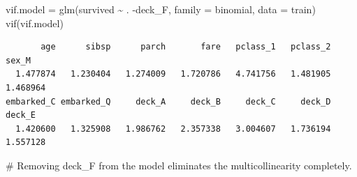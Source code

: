 \documentclass[
  letterpaper,
  DIV=11,
  numbers=noendperiod]{scrartcl}
\newenvironment{Shaded}{\begin{snugshade}}{\end{snugshade}}
\newcommand{\AttributeTok}[1]{\textcolor[rgb]{0.40,0.45,0.13}{#1}}
\newcommand{\CommentTok}[1]{\textcolor[rgb]{0.37,0.37,0.37}{#1}}
\newcommand{\FunctionTok}[1]{\textcolor[rgb]{0.28,0.35,0.67}{#1}}
\newcommand{\NormalTok}[1]{\textcolor[rgb]{0.00,0.23,0.31}{#1}}
\newcommand{\OtherTok}[1]{\textcolor[rgb]{0.00,0.23,0.31}{#1}}
\newcommand{\SpecialCharTok}[1]{\textcolor[rgb]{0.37,0.37,0.37}{#1}}
\begin{document}
\begin{Shaded}
\begin{Highlighting}[]
\NormalTok{vif.model }\OtherTok{=} \FunctionTok{glm}\NormalTok{(survived }\SpecialCharTok{\textasciitilde{}}\NormalTok{ . }\SpecialCharTok{{-}}\NormalTok{deck\_F, }\AttributeTok{family =}\NormalTok{ binomial, }\AttributeTok{data =}\NormalTok{ train)}
\FunctionTok{vif}\NormalTok{(vif.model)}
\end{Highlighting}
\end{Shaded}

\begin{verbatim}
       age      sibsp      parch       fare   pclass_1   pclass_2      sex_M 
  1.477874   1.230404   1.274009   1.720786   4.741756   1.481905   1.468964 
embarked_C embarked_Q     deck_A     deck_B     deck_C     deck_D     deck_E 
  1.420600   1.325908   1.986762   2.357338   3.004607   1.736194   1.557128 
\end{verbatim}

\begin{Shaded}
\begin{Highlighting}[]
\CommentTok{\# Removing deck\_F from the model eliminates the multicollinearity completely. }
\end{Highlighting}
\end{Shaded}
\end{document}
